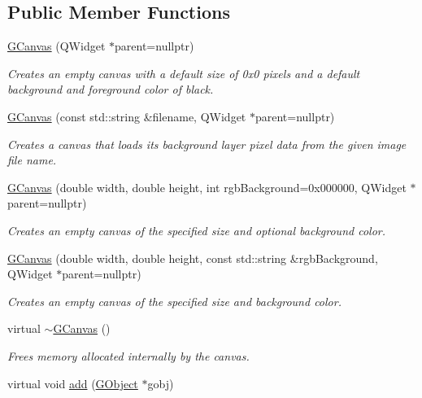 \subsection*{Public Member Functions}
\begin{DoxyCompactItemize}
\item 
\mbox{\hyperlink{classGCanvas_abb7f95d00cbfadedab276958e1eb2af1}{G\+Canvas}} (Q\+Widget $\ast$parent=nullptr)
\begin{DoxyCompactList}\small\item\em Creates an empty canvas with a default size of 0x0 pixels and a default background and foreground color of black. \end{DoxyCompactList}\item 
\mbox{\hyperlink{classGCanvas_a0a9de139286d0fc9146928aff8f0538c}{G\+Canvas}} (const std\+::string \&filename, Q\+Widget $\ast$parent=nullptr)
\begin{DoxyCompactList}\small\item\em Creates a canvas that loads its background layer pixel data from the given image file name. \end{DoxyCompactList}\item 
\mbox{\hyperlink{classGCanvas_a43d162947a216bef2c35eeaed9c7b88f}{G\+Canvas}} (double width, double height, int rgb\+Background=0x000000, Q\+Widget $\ast$parent=nullptr)
\begin{DoxyCompactList}\small\item\em Creates an empty canvas of the specified size and optional background color. \end{DoxyCompactList}\item 
\mbox{\hyperlink{classGCanvas_acc055a20116c6767125897b0a851e5cb}{G\+Canvas}} (double width, double height, const std\+::string \&rgb\+Background, Q\+Widget $\ast$parent=nullptr)
\begin{DoxyCompactList}\small\item\em Creates an empty canvas of the specified size and background color. \end{DoxyCompactList}\item 
virtual \mbox{\hyperlink{classGCanvas_a6b9dcf515cbbdf3432aea0946f5cc15f}{$\sim$\+G\+Canvas}} ()
\begin{DoxyCompactList}\small\item\em Frees memory allocated internally by the canvas. \end{DoxyCompactList}\item 
virtual void \mbox{\hyperlink{classGCanvas_afe8277e7b2627513c6f7452fb0b2847d}{add}} (\mbox{\hyperlink{classGObject}{G\+Object}} $\ast$gobj)

\end{DoxyCompactItemize}
